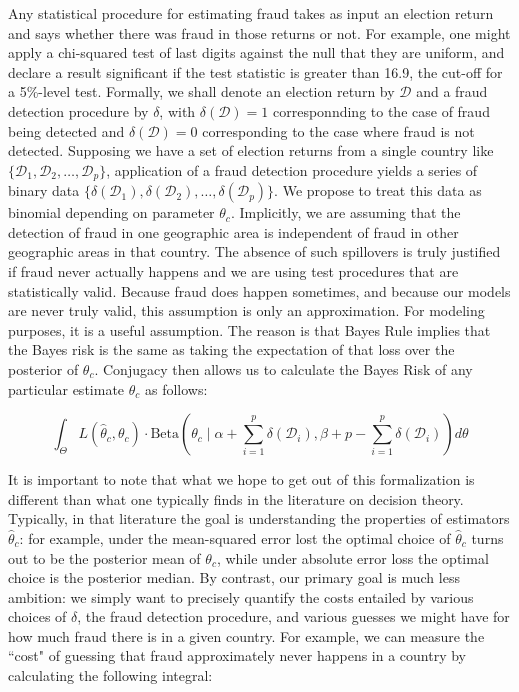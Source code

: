Any statistical procedure for estimating fraud takes as input an election return and says whether there was fraud in those returns or not. For example, one might apply a chi-squared test of last digits against the null that they are uniform, and declare a result significant if the test statistic is greater than 16.9, the cut-off for a 5\%-level test. Formally, we shall denote an election return by $\mathcal{D}$ and a fraud detection procedure by $\delta$, with $\delta(\mathcal{D})=1$ corresponnding to the case of fraud being detected and $\delta(\mathcal{D})=0$ corresponding to the case where fraud is not detected.  Supposing we have a set of election returns from a single country like $\{\mathcal{D}_1,\mathcal{D}_2,\ldots,\mathcal{D}_p \}$, application of a fraud detection procedure yields a series of binary data  $\{\delta(\mathcal{D}_1),\delta(\mathcal{D}_2),\ldots,\delta(\mathcal{D}_p)\}$. We propose to treat this data as binomial depending on parameter $\theta_c$. Implicitly, we are assuming that the detection of fraud in one geographic area is independent of fraud in other geographic areas in that country. The absence of such spillovers is truly justified if fraud never actually happens and we are using test procedures that are statistically valid. Because fraud does happen sometimes, and because our models are never truly valid, this assumption is only an approximation. For modeling purposes, it is a useful assumption.  The reason is that Bayes Rule implies that the Bayes risk is the same as taking the expectation of that loss over the posterior of $\theta_c$. Conjugacy then allows us to calculate the Bayes Risk of any particular estimate $\hat{\theta}_c$ as follows:

$$\int_\Theta L(\hat{\theta}_c,\theta_c) \cdot \textrm{Beta} \left(\theta_c \mid \alpha+\sum_{i=1}^p \delta(\mathcal{D}_i),\beta+p-\sum_{i=1}^p \delta(\mathcal{D}_i) \right) d\theta$$

It is important to note that what we hope to get out of this formalization is different than what one typically finds in the literature on decision theory. Typically, in that literature the goal is understanding the properties of estimators $\hat{\theta}_c$: for example, under the mean-squared error lost the optimal choice of $\hat{\theta}_c$ turns out to be the posterior mean of $\theta_c$, while under absolute error loss the optimal choice is the posterior median. By contrast, our primary goal is much less ambition: we simply want to precisely quantify the costs entailed by various choices of $\delta$, the fraud detection procedure, and various guesses we might have for how much fraud there is in a given country. For example, we can measure the ``cost" of guessing that fraud approximately never happens in a country by calculating the following integral:

